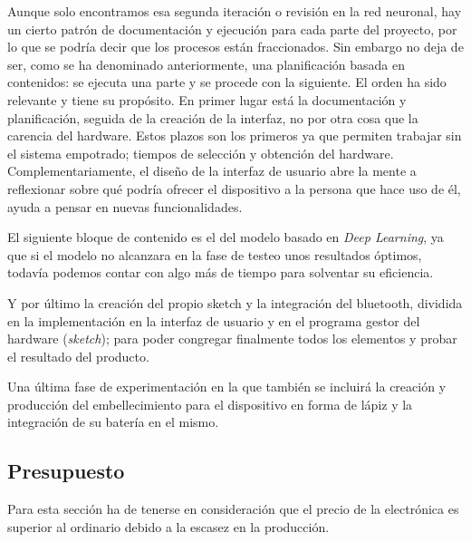 Aunque solo encontramos esa segunda iteración o revisión en la red neuronal,
hay un cierto patrón de documentación y ejecución para cada parte del
proyecto, por lo que se podría decir que los procesos están fraccionados.
Sin embargo no deja de ser, como se ha denominado anteriormente, una
planificación basada en contenidos: se ejecuta una parte y se procede con
la siguiente.
\newpage
El orden ha sido relevante y tiene su propósito. En primer lugar
está la documentación  y planificación, seguida de la creación de
la interfaz, no por otra cosa que la carencia del hardware. Estos plazos
son los primeros ya que permiten trabajar sin el sistema empotrado; tiempos
de selección y obtención del hardware. Complementariamente, el diseño
de la interfaz de usuario abre la mente a reflexionar sobre qué podría
ofrecer el dispositivo a la persona que hace uso de él, ayuda a pensar
en nuevas funcionalidades.

El siguiente bloque de contenido es el del modelo basado en
\textit{Deep Learning}, ya que si el modelo no alcanzara en la fase de
testeo unos resultados óptimos, todavía podemos contar con algo más de
tiempo para solventar su eficiencia.

Y por último la creación del propio sketch y la integración del bluetooth,
dividida en la implementación en la interfaz de usuario y en el programa
gestor del hardware (\textit{sketch}); para poder congregar finalmente
todos los elementos y probar el resultado del producto.

Una última fase de experimentación en la que también se incluirá la creación
y producción del embellecimiento para el dispositivo en forma de lápiz y la
integración de su batería en el mismo.

\subsection{Presupuesto}
Para esta sección ha de tenerse en consideración que el precio de la electrónica
es superior al ordinario debido a la escasez en la producción.

